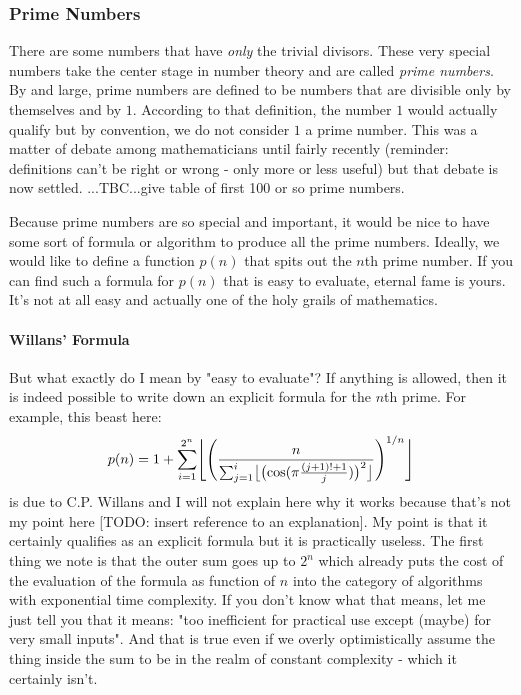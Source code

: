 \subsubsection{Prime Numbers}
There are some numbers that have \emph{only} the trivial divisors. These very special numbers take the center stage in number theory and are called \emph{prime numbers}. By and large, prime numbers are defined to be numbers that are divisible only by themselves and by $1$. According to that definition, the number $1$ would actually qualify but by convention, we do not consider $1$ a prime number. This was a matter of debate among mathematicians until fairly recently (reminder: definitions can't be right or wrong - only more or less useful) but that debate is now settled.
...TBC...give table of first 100 or so prime numbers.

\medskip
Because prime numbers are so special and important, it would be nice to have some sort of formula or algorithm to produce all the prime numbers. Ideally, we would like to define a function $p(n)$ that spits out the $n$th prime number. If you can find such a formula for $p(n)$ that is easy to evaluate, eternal fame is yours. It's not at all easy and actually one of the holy grails of mathematics.

\paragraph{Willans' Formula}
But what exactly do I mean by "easy to evaluate"? If anything is allowed, then it is indeed possible to write down an explicit formula for the $n$th prime. For example, this beast here:
\begin{equation}
 p(n) = 1 + \sum_{i = 1}^{2^n} 
 \floor[\Bigg]{
 \Biggl(
 \frac{n}{\sum_{j=1}^{i} \floor[\big]{ \bigl( \cos(\pi \frac{(j+1)!+1}{j}) \bigr)^2 } 
  }
 \Biggr)^{1/n}
 }
\end{equation}
is due to C.P. Willans and I will not explain here why it works because that's not my point here [TODO: insert reference to an explanation]. My point is that it certainly qualifies as an explicit formula but it is practically useless. The first thing we note is that the outer sum goes up to $2^n$ which already puts the cost of the evaluation of the formula as function of $n$ into the category of algorithms with exponential time complexity. If you don't know what that means, let me just tell you that it means: "too inefficient for practical use except (maybe) for very small inputs". And that is true even if we overly optimistically assume the thing inside the sum to be in the realm of constant complexity - which it certainly isn't. 

